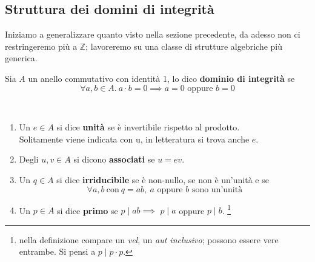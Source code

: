 \subsection{Struttura dei domini di integrità}
\label{lezione3}
Iniziamo a generalizzare quanto visto nella sezione precedente, da adesso non ci restringeremo più a $\mathbb{Z}$; lavoreremo su una classe di strutture algebriche più generica.
\begin{definizione} 
	Sia $A$ un anello commutativo con identità 1, lo dico \textbf{dominio di integrità} se 
	\begin{equation*}
	\forall a,b \in A. \ a \cdot b = 0 \implies a=0 \text{ oppure } b=0
	\end{equation*}
\end{definizione}
\begin{definizione}
	\
	\begin{enumerate}
		\item Un $e \in A$ si dice \textbf{unità} se è invertibile rispetto al prodotto. \\ Solitamente viene indicata con u, in letteratura si trova anche $e$.
		\item Degli $u,v \in A$ si dicono \textbf{associati} se $u=ev$.
		\item Un $q \in A$ si dice \textbf{irriducibile} se è non-nullo, se non è un'unità e se 
		\begin{equation*}
		\forall a,b \ \text{con} \ q=ab, \ \text{$a$ oppure $b$ sono un'unità}
		\end{equation*}
		\item Un $p \in A$ si dice \textbf{primo} se $p\mid ab \implies $ $p\mid a$ oppure $p\mid b$. \footnote{nella definizione compare un \textit{vel}, un \textit{aut inclusivo}; possono essere vere entrambe. Si pensi a $p\mid p\cdot p$.}
	\end{enumerate}
\end{definizione}
